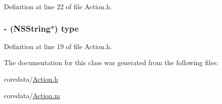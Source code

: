 Definition at line 22 of file Action.h.

\hypertarget{interface_action_abff6a04d71c2bba87e646615388a1f5c}{
\subsubsection[{type}]{\setlength{\rightskip}{0pt plus 5cm}-\/ (NSString$\ast$) type}}
\label{interface_action_abff6a04d71c2bba87e646615388a1f5c}


Definition at line 19 of file Action.h.



The documentation for this class was generated from the following files:\begin{DoxyCompactItemize}
\item 
coredata/\hyperlink{_action_8h}{Action.h}\item 
coredata/\hyperlink{_action_8m}{Action.m}\end{DoxyCompactItemize}
